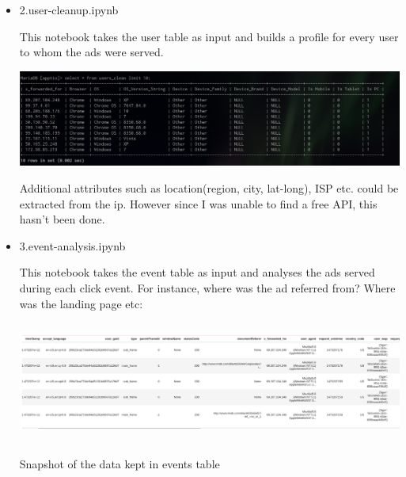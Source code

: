 \documentclass[11pt]{article}
\begin{document}
\begin{itemize}
\item 2.user-cleanup.ipynb

This notebook takes the user table as input and builds a profile for every user to whom the ads were served.

\begin{center}
\includegraphics[width=.9\linewidth]{imgs/users-clean.png}
\end{center}

Additional attributes such as location(region, city, lat-long), ISP etc. could be extracted from the ip.
However since I was unable to find a free API, this hasn't been done.

\item 3.event-analysis.ipynb

This notebook takes the event table as input and analyses the ads served during each click event.
For instance, where was the ad referred from? Where was the landing page etc:

\begin{center}
\includegraphics[height=150]{imgs/events2.png}
\end{center}

\begin{center}
Snapshot of the data kept in events table
\end{center}


\end{itemize}
\end{document}
